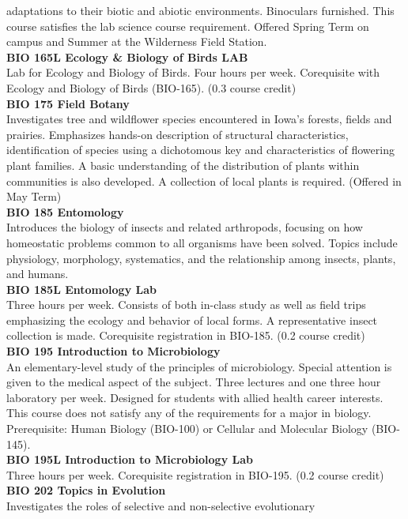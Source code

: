 \documentclass[
  letterpaper,
]{scrbook}
\begin{document}
adaptations to their biotic and abiotic environments. Binoculars
furnished. This course satisfies the lab science course requirement.
Offered Spring Term on campus and Summer at the Wilderness Field
Station.\\
\textbf{BIO 165L Ecology \& Biology of Birds LAB}\\
Lab for Ecology and Biology of Birds. Four hours per week. Corequisite
with Ecology and Biology of Birds (BIO-165). (0.3 course credit)\\
\textbf{BIO 175 Field Botany}\\
Investigates tree and wildflower species encountered in Iowa's forests,
fields and prairies. Emphasizes hands-on description of structural
characteristics, identification of species using a dichotomous key and
characteristics of flowering plant families. A basic understanding of
the distribution of plants within communities is also developed. A
collection of local plants is required. (Offered in May Term)\\
\textbf{BIO 185 Entomology}\\
Introduces the biology of insects and related arthropods, focusing on
how homeostatic problems common to all organisms have been solved.
Topics include physiology, morphology, systematics, and the relationship
among insects, plants, and humans.\\
\textbf{BIO 185L Entomology Lab}\\
Three hours per week. Consists of both in-class study as well as field
trips emphasizing the ecology and behavior of local forms. A
representative insect collection is made. Corequisite registration in
BIO-185. (0.2 course credit)\\
\textbf{BIO 195 Introduction to Microbiology}\\
An elementary-level study of the principles of microbiology. Special
attention is given to the medical aspect of the subject. Three lectures
and one three hour laboratory per week. Designed for students with
allied health career interests. This course does not satisfy any of the
requirements for a major in biology. Prerequisite: Human Biology
(BIO-100) or Cellular and Molecular Biology (BIO-145).\\
\textbf{BIO 195L Introduction to Microbiology Lab}\\
Three hours per week. Corequisite registration in BIO-195. (0.2 course
credit)\\
\textbf{BIO 202 Topics in Evolution}\\
Investigates the roles of selective and non-selective evolutionary
\end{document}
